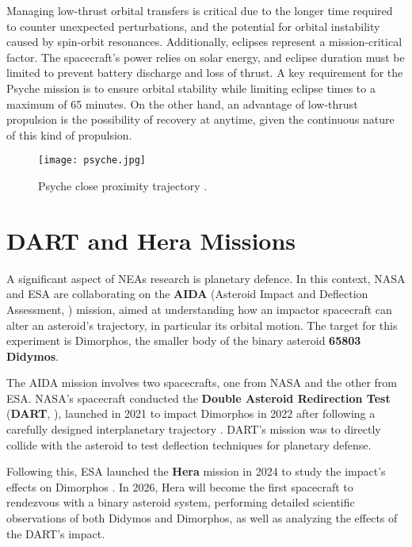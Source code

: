 \documentclass{Configuration_gigi/PoliMi3i_thesis}
\begin{document}
Managing low-thrust orbital transfers is critical due to the longer time required to counter unexpected perturbations, and the potential for orbital instability caused by spin-orbit resonances. Additionally, eclipses represent a mission-critical factor. The spacecraft's power relies on solar energy, and eclipse duration must be limited to prevent battery discharge and loss of thrust. A key requirement for the Psyche mission is to ensure orbital stability while limiting eclipse times to a maximum of 65 minutes. On the other hand, an advantage of low-thrust propulsion is the possibility of recovery at anytime, given the continuous nature of this kind of propulsion.

\begin{figure}[H]
    \centering
    \texttt{[image: psyche.jpg]}
    \caption[Psyche proximity operations.]{Psyche close proximity trajectory \cite{psycheMA}.}
    \label{fig:GG}
\end{figure}


\section{DART and Hera Missions}\label{Sec:DART and Hera Missions}

A significant aspect of NEAs research is planetary defence. In this context, NASA and ESA are collaborating on the \textbf{AIDA} (Asteroid Impact and Deflection Assessment, \cite{aida}) mission, aimed at understanding how an impactor spacecraft can alter an asteroid's trajectory, in particular its orbital motion. The target for this experiment is Dimorphos, the smaller body of the binary asteroid \textbf{65803 Didymos}.

The AIDA mission involves two spacecrafts, one from NASA and the other from ESA. NASA's spacecraft conducted the \textbf{Double Asteroid Redirection Test} (\textbf{DART}, \cite{dart}), launched in 2021 to impact Dimorphos in 2022 after following a carefully designed interplanetary trajectory \cite{dartMA}. DART's mission was to directly collide with the asteroid to test deflection techniques for planetary defense.

Following this, ESA launched the \textbf{Hera} mission in 2024 to study the impact's effects on Dimorphos \cite{hera}. In 2026, Hera will become the first spacecraft to rendezvous with a binary asteroid system, performing detailed scientific observations of both Didymos and Dimorphos, as well as analyzing the effects of the DART's impact.
\end{document}

